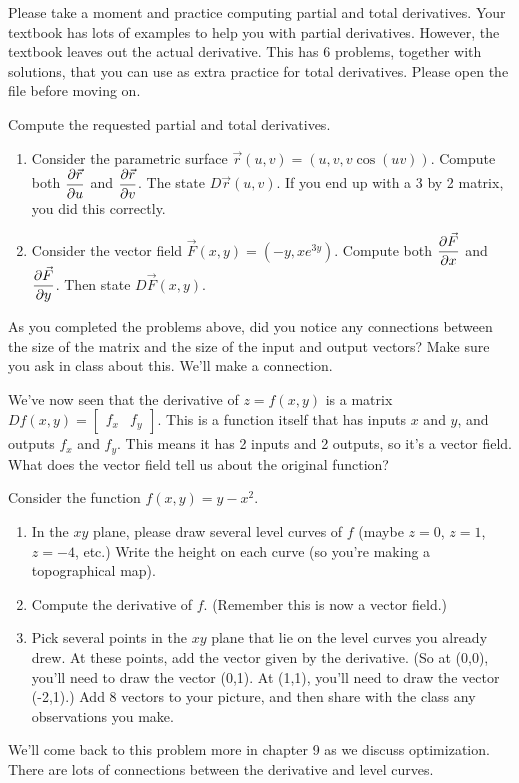 Please take a moment and practice computing partial and total derivatives.  Your textbook has lots of examples to help you with partial derivatives. However, the textbook leaves out the actual derivative.  This  has 6 problems, together with solutions, that you can use as extra practice for total derivatives. Please open the file before moving on.

\begin{problem}
Compute the requested partial and total derivatives.
\begin{enumerate}
 \item  Consider the parametric surface $\vec r(u,v) = (u,v,v\cos(uv))$. Compute both $\displaystyle\frac{\partial \vec r}{\partial u}$ and $\displaystyle\frac{\partial \vec r}{\partial v}$. The state $D\vec r(u,v)$. If you end up with a 3 by 2 matrix, you did this correctly.
 \item  Consider the vector field $\vec F(x,y) = (-y,xe^{3y})$. Compute both $\displaystyle\frac{\partial \vec F}{\partial x}$ and $\displaystyle\frac{\partial \vec F}{\partial y}$. Then state $D\vec F(x,y)$. 
\end{enumerate}
\end{problem}

As you completed the problems above, did you notice any connections between the size of the matrix and the size of the input and output vectors?  Make sure you ask in class about this.  We'll make a connection.


We've now seen that the derivative of $z=f(x,y)$ is a matrix $Df(x,y) = \begin{bmatrix}f_x & f_y\end{bmatrix}$. This is a function itself that has inputs $x$ and $y$, and outputs $f_x$ and $f_y$. This means it has 2 inputs and 2 outputs, so it's a vector field. What does the vector field tell us about the original function?
\begin{problem}
 Consider the function $f(x,y)=y-x^2$. 
\begin{enumerate}
 \item In the $xy$ plane, please draw several level curves of $f$ (maybe $z=0$, $z=1$, $z=-4$, etc.)  Write the height on each curve (so you're making a topographical map).
 \item Compute the derivative of $f$. (Remember this is now a vector field.)
 \item Pick several points in the $xy$ plane that lie on the level curves you already drew.  At these points, add the vector given by the derivative.  (So at (0,0), you'll need to draw the vector (0,1).  At (1,1), you'll need to draw the vector (-2,1).) Add 8 vectors to your picture, and then share with the class any observations you make.
\end{enumerate}

\end{problem}
We'll come back to this problem more in chapter 9 as we discuss optimization.  There are lots of connections between the derivative and level curves. 


